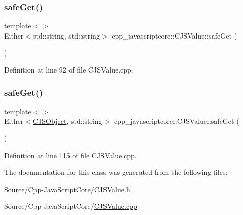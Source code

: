 \subsubsection{\texorpdfstring{safe\+Get()}{safeGet()}\hspace{0.1cm}{\footnotesize\ttfamily [2/3]}}
{\footnotesize\ttfamily template$<$$>$ \\
Either$<$std\+::string, std\+::string$>$ cpp\+\_\+javascriptcore\+::\+C\+J\+S\+Value\+::safe\+Get (\begin{DoxyParamCaption}{ }\end{DoxyParamCaption})}



Definition at line 92 of file C\+J\+S\+Value.\+cpp.

\mbox{\label{classcpp__javascriptcore_1_1_c_j_s_value_a66dc7d40bba42c44343ba034edfd422f}} 
\subsubsection{\texorpdfstring{safe\+Get()}{safeGet()}\hspace{0.1cm}{\footnotesize\ttfamily [3/3]}}
{\footnotesize\ttfamily template$<$$>$ \\
Either$<$\mbox{\hyperlink{classcpp__javascriptcore_1_1_c_j_s_object}{C\+J\+S\+Object}}, std\+::string$>$ cpp\+\_\+javascriptcore\+::\+C\+J\+S\+Value\+::safe\+Get (\begin{DoxyParamCaption}{ }\end{DoxyParamCaption})}



Definition at line 115 of file C\+J\+S\+Value.\+cpp.



The documentation for this class was generated from the following files\+:\begin{DoxyCompactItemize}
\item 
Source/\+Cpp-\/\+Java\+Script\+Core/\mbox{\hyperlink{_c_j_s_value_8h}{C\+J\+S\+Value.\+h}}\item 
Source/\+Cpp-\/\+Java\+Script\+Core/\mbox{\hyperlink{_c_j_s_value_8cpp}{C\+J\+S\+Value.\+cpp}}\end{DoxyCompactItemize}
